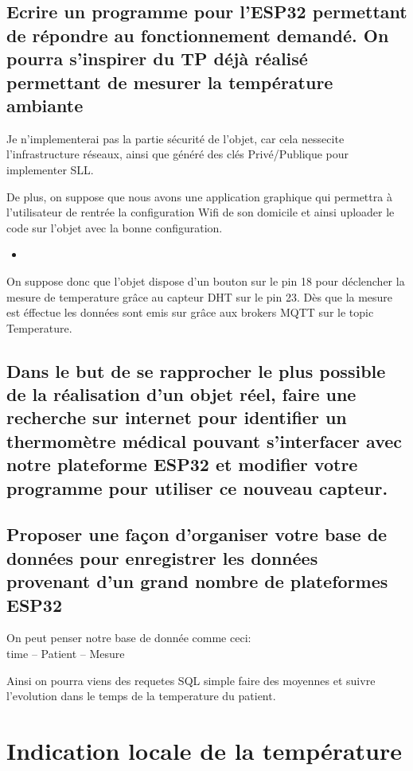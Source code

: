 \documentclass[10pt,a4paper]{article}
\newcommand{\insertcode}[2]{\begin{itemize}\item[]\end{itemize}}
\begin{document}
\subsection{ Ecrire un programme pour l’ESP32 permettant de répondre au fonctionnement demandé. On pourra s’inspirer du TP déjà réalisé permettant de mesurer la température ambiante }
Je n'implementerai pas la partie sécurité de l'objet, car cela nessecite l'infrastructure réseaux, ainsi que généré des clés Privé/Publique pour implementer SLL.

De plus, on suppose que nous avons une application graphique qui permettra à l'utilisateur de rentrée la configuration Wifi de son domicile et ainsi uploader le code sur l'objet avec la bonne configuration.

\insertcode{code/1.ino}{Premiere Implementation}

On suppose donc que l'objet dispose d'un bouton sur le pin 18 pour déclencher la mesure de temperature grâce au capteur DHT sur le pin 23. Dès que la mesure est éffectue les données sont emis sur grâce aux brokers MQTT sur le topic Temperature.



\subsection{Dans le but de se rapprocher le plus possible de la réalisation d’un objet réel, faire une recherche sur internet pour identifier un thermomètre médical pouvant s’interfacer avec notre plateforme ESP32 et modifier votre programme pour utiliser ce nouveau capteur. }



\subsection{Proposer une façon d’organiser votre base de données pour enregistrer les données provenant d’un grand nombre de plateformes ESP32}

On peut penser notre base de donnée comme ceci:\\ 
time  --    Patient     --  Mesure


Ainsi on pourra viens des requetes SQL simple faire des moyennes et suivre l'evolution dans le temps de la temperature du patient. 

\newpage
\section{Indication locale de la température }
\end{document}
